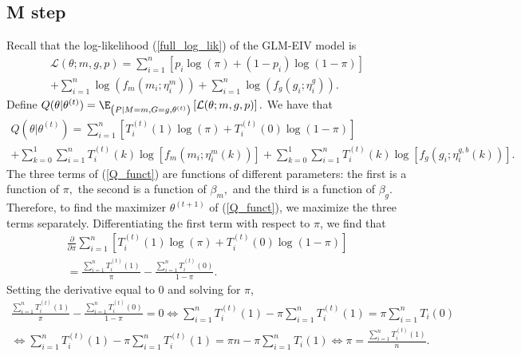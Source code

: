 \documentclass[12pt]{article}
\begin{document}
\begin{appendices}
\subsection*{M step}
Recall that the log-likelihood (\ref{full_log_lik}) of the GLM-EIV model  is
\begin{multline*}
\mathcal{L}(\theta; m, g, p) = \sum_{i=1}^n \left[ p_i \log(\pi) + (1-p_i) \log(1-\pi) \right] \\ + \sum_{i=1}^n \log\left( f_m(m_i; \eta^m_i)\right) + \sum_{i=1}^n \log\left( f_g(g_i; \eta_i^g) \right).
\end{multline*}
Define $Q(\theta | \theta^{(t)}) = \E_{\left(P |M = m, G = g, \theta^{(t)}\right)}\left[ \mathcal{L}(\theta; m, g, p) \right].$ We have that
\begin{multline}\label{Q_funct}
Q(\theta |\theta^{(t)}) = \sum_{i=1}^n \left[T^{(t)}_i(1)\log(\pi) + T_i^{(t)}(0) \log(1 - \pi)\right] \\ + \sum_{k=0}^1 \sum_{i=1}^n T^{(t)}_i(k) \log \left[ f_m(m_i; \eta_i^m(k)) \right] + \sum_{k=0}^1 \sum_{i=1}^n T^{(t)}_i(k) \log \left[ f_g( g_i; \eta^{g,b}_i(k)) \right].
\end{multline}
The three terms of (\ref{Q_funct}) are functions of different parameters: the first is a function of $\pi,$ the second is a function of $\beta_m,$ and the third is a function of $\beta_g$. Therefore, to find the maximizer $\theta^{(t+1)}$ of (\ref{Q_funct}), we maximize the three terms separately. Differentiating the first term with respect to $\pi$, we find that
	\begin{multline*}
\frac{ \partial }{\partial \pi } \sum_{i=1}^n \left[ T^{(t)}_i(1)\log(\pi) + T_i^{(t)}(0) \log(1 - \pi)\right]  \\ = \frac{\sum_{i=1}^n T_i^{(t)}(1)}{\pi} - \frac{ \sum_{i=1}^n T_i^{(t)}(0) }{ 1 - \pi}.
\end{multline*} Setting the derivative equal to $0$ and solving for $\pi$,
\begin{multline*}
\frac{\sum_{i=1}^n T_i^{(t)}(1)}{\pi} - \frac{ \sum_{i=1}^n T_i^{(t)}(0) }{ 1 - \pi} = 0 \iff \sum_{i=1}^n T_i^{(t)}(1) - \pi \sum_{i=1}^n T^{(t)}_i(1) = \pi \sum_{i=1}^n T_i(0) \\ \iff \sum_{i=1}^n T^{(t)}_i(1) - \pi\sum_{i=1}^n T_i^{(t)}(1) = \pi n - \pi\sum_{i=1}^n T_i(1) \iff \pi = \frac{ \sum_{i=1}^n T_i^{(t)} (1) }{n}.\end{multline*}

\end{appendices}
\end{document}
